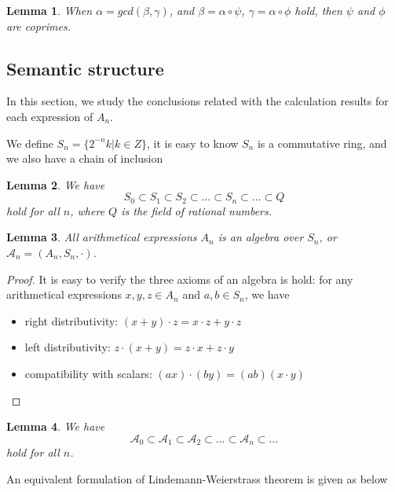 \documentclass{article}
\newtheorem{lemma}{Lemma}
\begin{document}
\begin{lemma}
\label{lemma:coprimes}
When $\alpha = gcd(\beta, \gamma)$, and $\beta = \alpha \circ \psi$, $\gamma = \alpha \circ \phi$ hold, then $\psi$ and $\phi$ are coprimes.
\end{lemma}

\subsection{Semantic structure}\label{sec:semantic}

In this section, we study the conclusions related with the calculation results for each expression of $A_n$.

We define $S_n = \{2^{-n}k | k \in Z\}$, it is easy to know $S_n$ is a commutative ring, and we also have a chain of inclusion

\begin{lemma}
\label{lemma:chainofinclusion2}
We have
$$ S_0 \subset S_1 \subset S_2 \subset \ldots \subset S_n \subset \ldots \subset Q$$
hold for all $n$, where $Q$ is the field of rational numbers.
\end{lemma}

\begin{lemma}
\label{lemma:arithmeticalalgebra}
All arithmetical expressions $A_n$ is an algebra over $S_n$, or $\mathcal{A}_n = (A_n, S_n, \cdot)$.
\end{lemma}

\begin{proof}
It is easy to verify the three axioms of an algebra is hold:
for any arithmetical expressions $x, y, z \in A_n$ and $a, b \in S_n$, we have
\begin{itemize}
    \item right distributivity: $(x + y) \cdot z = x \cdot z + y \cdot z$
    \item left distributivity: $z \cdot (x + y) = z \cdot x + z \cdot y$
    \item compatibility with scalars: $(ax) \cdot (by) = (ab) (x \cdot y)$
\end{itemize}
\qedhere
\end{proof}

\begin{lemma}
\label{lemma:chainofinclusion3}
We have
$$ \mathcal{A}_0 \subset \mathcal{A}_1 \subset \mathcal{A}_2 \subset \ldots \subset \mathcal{A}_n \subset \ldots $$
hold for all $n$.
\end{lemma}

An equivalent formulation of Lindemann-Weierstrass theorem is given as below
\end{document}
